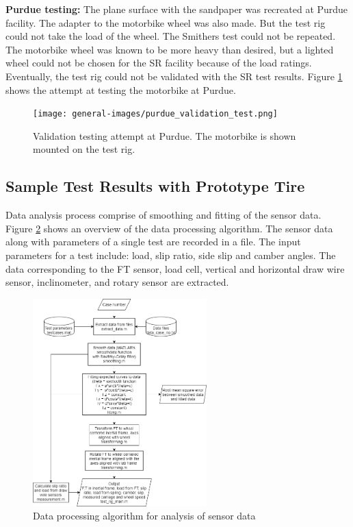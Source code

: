\documentclass{article}
\begin{document}
\textbf{Purdue testing:} The plane surface with the sandpaper was recreated at Purdue facility. The adapter to the motorbike wheel was also made. But the test rig could not take the load of the wheel. The Smithers  test could not be repeated. The motorbike wheel was known to be more heavy than desired, but a lighted wheel could not be chosen for the SR facility because of the load ratings. Eventually, the test rig could not be validated with the SR test results. Figure \ref{fig:purdue-validation-test} shows the attempt at testing the motorbike at Purdue.

\begin{figure}[hbt!]
\centering
\texttt{[image: general-images/purdue\_validation\_test.png]}
\caption{Validation testing attempt at Purdue. The motorbike is shown mounted on the test rig.}
\label{fig:purdue-validation-test}
\end{figure}

\subsection{Sample Test Results with Prototype Tire}

Data analysis process comprise of smoothing and fitting of the sensor data. Figure \ref{fig:data-processing-algorithm} shows an overview of the data processing algorithm. The sensor data along with parameters of a single test are recorded in a file. The input parameters for a test include: load, slip ratio, side slip and camber angles. The data corresponding to the FT sensor, load cell, vertical and horizontal draw wire sensor, inclinometer, and rotary sensor are extracted. 

\begin{figure}[hbt!]
\centering
\includegraphics[width=0.6\textwidth]{general-images/test_rig_data_analysis.png}
\caption{Data processing algorithm for analysis of sensor data}
\label{fig:data-processing-algorithm}
\end{figure}
\end{document}
